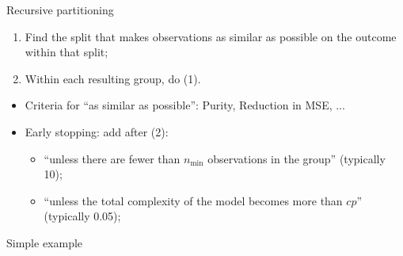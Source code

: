 \documentclass[xcolor=table,aspectratio=169]{beamer}
\begin{document}
\begin{frame}{Recursive partitioning}
	\begin{enumerate}
		\item Find the split that makes observations as similar as possible on the outcome within that split;
		\item Within each resulting group, do (1).
	\end{enumerate}
	
	\bigskip
	\begin{itemize}
		\item Criteria for ``as similar as possible'': Purity, Reduction in MSE, ...
		\item Early stopping: add after (2):
		\begin{itemize}
			\item ``unless there are fewer than $n_{\text{min}}$ observations in the group'' (typically 10);
			\item ``unless the total complexity of the model becomes more than $cp$'' (typically 0.05);
		\end{itemize}
	\end{itemize}
\end{frame}

\begin{frame}
	Simple example
\end{frame}
\end{document}
